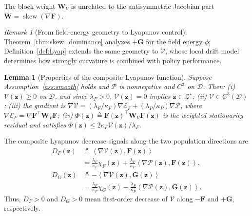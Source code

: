 \documentclass{article}
\newtheorem{lemma}{Lemma}
\theoremstyle{remark}
\newtheorem{remark}{Remark}
\newcommand{\inner}[2]{\left\langle #1,#2\right\rangle}
\newcommand{\skewop}{\operatorname{skew}}
\newcommand{\cD}{\mathcal{D}}
\newcommand{\bz}{\boldsymbol{z}}
\newcommand{\bW}{\boldsymbol{W}}
\newcommand{\bF}{\boldsymbol{F}}
\newcommand{\bG}{\boldsymbol{G}}
\newcommand{\Vk}{\mathcal{V}}
\newcommand{\cE}{\mathcal{E}}
\newcommand{\cP}{\mathcal{P}}
\begin{document}
The block weight $\bW_V$ is unrelated to the antisymmetric Jacobian part $\bW=\skewop(\nabla\bF)$.

\begin{remark}[From field-energy geometry to Lyapunov control]\label{rem:geometry_merit}
Theorem~\ref{thm:skew_dominance} analyzes $+\bG$ for the field energy $\phi$; Definition~\ref{def:Lyap} extends the same geometry to $\Vk$, whose local drift model determines how strongly curvature is combined with policy performance.
\end{remark}

\begin{lemma}[Properties of the composite Lyapunov function]\label{lem:Lyap_properties}
Suppose Assumption~\ref{ass:smooth} holds and $\cP$ is nonnegative and $C^{3}$ on $\cD$.
Then:
(i) $\Vk(\bz)\ge 0$ on $\cD$, and since $\lambda_{F}>0$, $\Vk(\bz)=0$ implies $\bz\in\mathcal{Z}^{\star}$;
(ii) $\Vk\in C^{3}(\cD)$;
(iii) the gradient is $\nabla\Vk=(\lambda_F/\kappa_F)\nabla\cE_F +(\lambda_P/\kappa_P)\nabla\cP$, where $\nabla\cE_F=\nabla\bF^{\top}\bW_V\bF$;
(iv) $\Phi(\bz)\triangleq\bF(\bz)^{\top}\bW_{V}\bF(\bz)$ is the weighted stationarity residual and satisfies $\Phi(\bz)\le2\kappa_{F}\Vk(\bz)/\lambda_{F}$.
\end{lemma}

The composite Lyapunov decrease signals along the two population directions are
\begin{equation}\label{eq:composite_signals}
\begin{aligned}
D_F(\bz)
&\triangleq\inner{\nabla\Vk(\bz)}{\bF(\bz)}
\\[-2pt]
&=\frac{\lambda_F}{\kappa_F}\chi_F(\bz)
+\frac{\lambda_P}{\kappa_P}\inner{\nabla\cP(\bz)}{\bF(\bz)},\\
D_G(\bz)
&\triangleq-\inner{\nabla\Vk(\bz)}{\bG(\bz)}
\\[-2pt]
&=\frac{\lambda_F}{\kappa_F}\chi_G(\bz)
-\frac{\lambda_P}{\kappa_P}\inner{\nabla\cP(\bz)}{\bG(\bz)}.
\end{aligned}
\end{equation}
Thus, $D_F>0$ and $D_G>0$ mean first-order decrease of $\Vk$ along $-\bF$ and $+\bG$, respectively.
\end{document}
